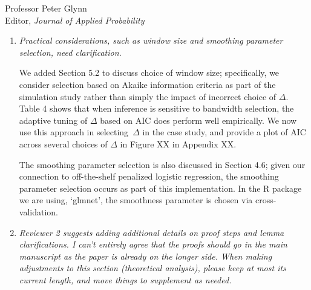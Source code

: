 \documentclass[11pt]{letter} %
\begin{document}
\begin{letter}{Professor
	Peter Glynn\\
	Editor, {\em Journal of Applied Probability}}
\begin{enumerate}
\vspace{5mm}
We have decided that the point we were trying to raise is non-essential to the current manuscript, so we have removed the discussion of \emph{independent evolution} and its implication that $\varepsilon (t) = 0$ for all $t >0$.  The key issue we were trying to clarify is that the traditional joint model formulation in which the observed health process and time-to-event are conditionally independent given the latent process implies that the hazard function conditional on the entire observed health process depends on values after the current time.  In the case study, for example, this implies that the expected risk of a button press given the entire sensor process will depend on future activity index and electrodermal activity.  This holds unless we assume the measurement error is set to zero.  While we still think it is an important point that should be more well appreciated in the joint modeling literature, the current paper has enough content for this discussion to be omitted.  Moreover, the empirical impact seems to be limited and therefore it is better to make this point in a different manuscript and case study.
\vspace{5mm}

\item {\it Practical considerations, such as window size and smoothing parameter selection, need clarification.}

\vspace{5mm}
We added Section 5.2 to discuss choice of window size; specifically, we consider selection based on Akaike information criteria as part of the simulation study rather than simply the impact of incorrect choice of $\Delta$. Table 4 shows that when inference is sensitive to bandwidth selection, the adaptive tuning of $\Delta$ based on AIC does perform well empirically.  We now use this approach in selecting~$\Delta$ in the case study, and provide a plot of AIC across several choices of $\Delta$ in Figure XX in Appendix XX.
\vspace{5mm}

The smoothing parameter selection is also discussed in Section 4.6; given our connection to off-the-shelf penalized logistic regression, the smoothing parameter selection occurs as part of this implementation.  In the R package we are using, `glmnet', the smoothness parameter is chosen via cross-validation.
\vspace{5mm}

\item {\it Reviewer 2 suggests adding additional details on proof steps and lemma clarifications. I can't entirely agree that the proofs should go in the main manuscript as the paper is already on the longer side. When making adjustments to this section (theoretical analysis), please keep at most its current length, and move things to supplement as needed.}


\end{enumerate}
\end{letter}
\end{document}
